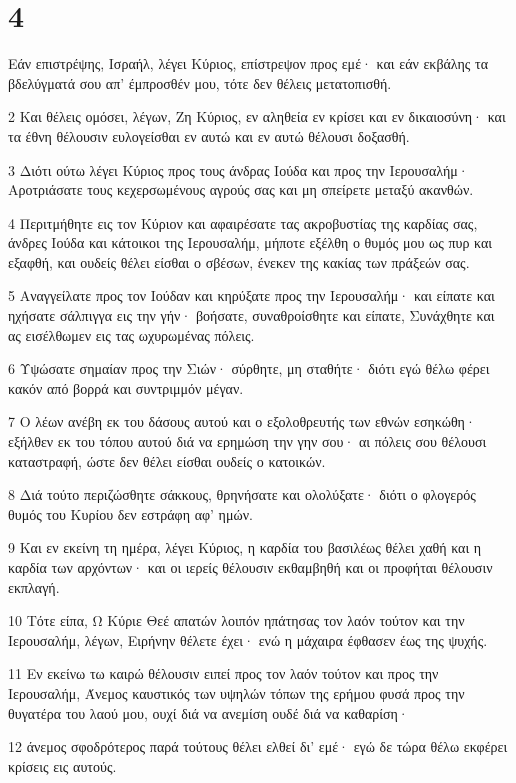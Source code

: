 \chapter{4}

\par Εάν επιστρέψης, Ισραήλ, λέγει Κύριος, επίστρεψον προς εμέ· και εάν εκβάλης τα βδελύγματά σου απ' έμπροσθέν μου, τότε δεν θέλεις μετατοπισθή.
\par 2 Και θέλεις ομόσει, λέγων, Ζη Κύριος, εν αληθεία εν κρίσει και εν δικαιοσύνη· και τα έθνη θέλουσιν ευλογείσθαι εν αυτώ και εν αυτώ θέλουσι δοξασθή.
\par 3 Διότι ούτω λέγει Κύριος προς τους άνδρας Ιούδα και προς την Ιερουσαλήμ· Αροτριάσατε τους κεχερσωμένους αγρούς σας και μη σπείρετε μεταξύ ακανθών.
\par 4 Περιτμήθητε εις τον Κύριον και αφαιρέσατε τας ακροβυστίας της καρδίας σας, άνδρες Ιούδα και κάτοικοι της Ιερουσαλήμ, μήποτε εξέλθη ο θυμός μου ως πυρ και εξαφθή, και ουδείς θέλει είσθαι ο σβέσων, ένεκεν της κακίας των πράξεών σας.
\par 5 Αναγγείλατε προς τον Ιούδαν και κηρύξατε προς την Ιερουσαλήμ· και είπατε και ηχήσατε σάλπιγγα εις την γήν· βοήσατε, συναθροίσθητε και είπατε, Συνάχθητε και ας εισέλθωμεν εις τας ωχυρωμένας πόλεις.
\par 6 Υψώσατε σημαίαν προς την Σιών· σύρθητε, μη σταθήτε· διότι εγώ θέλω φέρει κακόν από βορρά και συντριμμόν μέγαν.
\par 7 Ο λέων ανέβη εκ του δάσους αυτού και ο εξολοθρευτής των εθνών εσηκώθη· εξήλθεν εκ του τόπου αυτού διά να ερημώση την γην σου· αι πόλεις σου θέλουσι καταστραφή, ώστε δεν θέλει είσθαι ουδείς ο κατοικών.
\par 8 Διά τούτο περιζώσθητε σάκκους, θρηνήσατε και ολολύξατε· διότι ο φλογερός θυμός του Κυρίου δεν εστράφη αφ' ημών.
\par 9 Και εν εκείνη τη ημέρα, λέγει Κύριος, η καρδία του βασιλέως θέλει χαθή και η καρδία των αρχόντων· και οι ιερείς θέλουσιν εκθαμβηθή και οι προφήται θέλουσιν εκπλαγή.
\par 10 Τότε είπα, Ω Κύριε Θεέ απατών λοιπόν ηπάτησας τον λαόν τούτον και την Ιερουσαλήμ, λέγων, Ειρήνην θέλετε έχει· ενώ η μάχαιρα έφθασεν έως της ψυχής.
\par 11 Εν εκείνω τω καιρώ θέλουσιν ειπεί προς τον λαόν τούτον και προς την Ιερουσαλήμ, Άνεμος καυστικός των υψηλών τόπων της ερήμου φυσά προς την θυγατέρα του λαού μου, ουχί διά να ανεμίση ουδέ διά να καθαρίση·
\par 12 άνεμος σφοδρότερος παρά τούτους θέλει ελθεί δι' εμέ· εγώ δε τώρα θέλω εκφέρει κρίσεις εις αυτούς.
